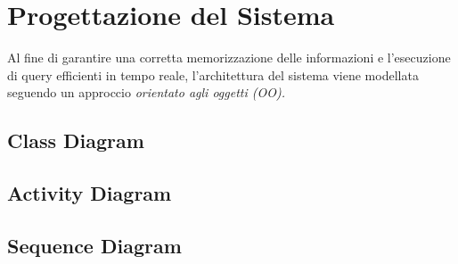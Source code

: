 \chapter{Progettazione del Sistema}
Al fine di garantire una corretta memorizzazione delle informazioni e l'esecuzione di query efficienti in tempo reale, l'architettura del sistema viene modellata seguendo un approccio \textit{orientato agli oggetti (OO).} 

\section*{Class Diagram }


\newpage
\section*{Activity Diagram }


\newpage
\section*{Sequence Diagram }


